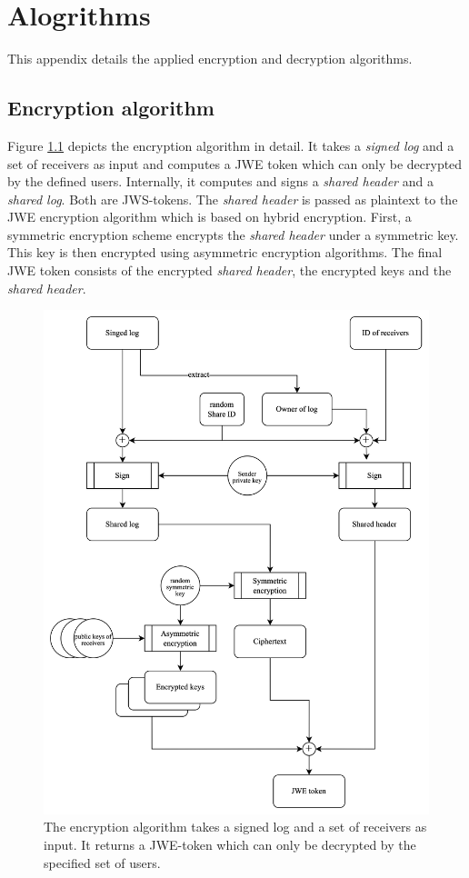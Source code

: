 \documentclass[../main.tex]{subfiles}
\begin{document}
\chapter{Alogrithms}

This appendix details the applied encryption and decryption algorithms.

\section{Encryption algorithm}
\label{app:encryption}
Figure \ref{app:encryption_algo} depicts the encryption algorithm in detail.
It takes a \textit{signed log} and a set of receivers as input and computes a JWE token which can only be decrypted by the defined users.
Internally, it computes and signs a \textit{shared header} and a \textit{shared log}.
Both are JWS-tokens.
The \textit{shared header} is passed as plaintext to the JWE encryption algorithm which is based on hybrid encryption.
First, a symmetric encryption scheme encrypts the \textit{shared header} under a symmetric key.
This key is then encrypted using asymmetric encryption algorithms.
The final JWE token consists of the encrypted \textit{shared header}, the encrypted keys and the \textit{shared header}.

\begin{figure}[h!]
    \includegraphics[scale=0.12]{../img/05/encrypt_logs.jpg}
    \centering
    \caption{The encryption algorithm takes a signed log and a set of receivers as input. It returns a JWE-token which can only be decrypted by the specified set of users.}
    \label{app:encryption_algo}
\end{figure}
\end{document}
